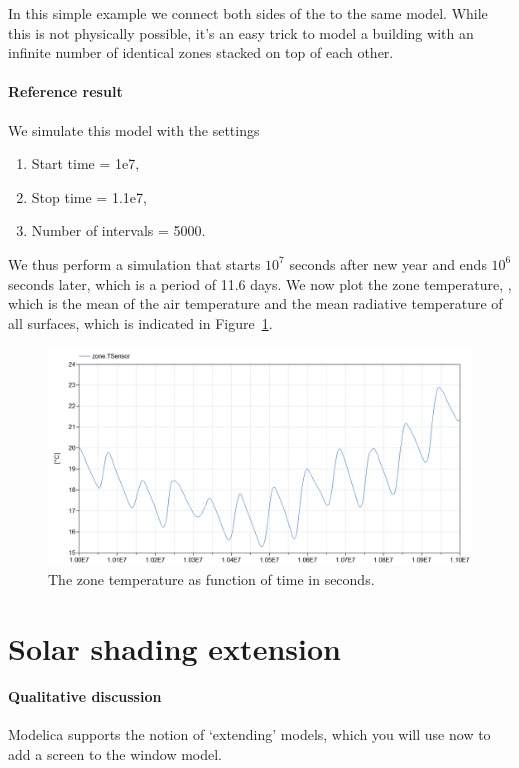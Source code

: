 \documentclass[10pt,a4paper]{article}
\begin{document}
In this simple example we connect both sides of the  to the same model.
While this is not physically possible, it's an easy trick to model a building with an 
infinite number of identical zones stacked on top of each other.

\paragraph{Reference result}
We simulate this model with the settings
\begin{enumerate}
\item Start time = 1e7,
\item Stop time = 1.1e7,
\item Number of intervals = 5000.
\end{enumerate}
We thus perform a simulation that starts $10^7$ seconds after new year and ends $10^6$
seconds later, which is a period of 11.6 days.
We now plot the zone temperature, ,
which is the mean of the air temperature and the mean radiative 
temperature of all surfaces, which is indicated in Figure~\ref{fig:res1}.

\begin{figure}[h!]
\centering
\includegraphics[scale=0.65]{Example1.png}
\caption{The zone temperature as function of time in seconds.}
\label{fig:res1}
\end{figure}

\newpage

\section{Solar shading extension}
\paragraph{Qualitative discussion}
Modelica supports the notion of `extending' models, which you will
use now to add a screen to the window model.
\end{document}
